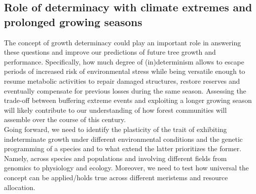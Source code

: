 \documentclass{article}
\begin{document}
\subsection*{Role of determinacy with climate extremes and prolonged growing seasons} %
The concept of growth determinacy could play an important role in answering these questions and improve our predictions of future tree growth and performance. Specifically, how much degree of (in)determinism allows to escape periods of increased risk of environmental stress while being versatile enough to resume metabolic activities to repair damaged structures, restore reserves and eventually compensate for previous losses during the same season. Assessing the trade-off between buffering extreme events and exploiting a longer growing season will likely contribute to our understanding of how forest communities will assemble over the course of this century.\\

Going forward, we need to identify the plasticity of the trait of exhibiting indeterminate growth under different environmental conditions and the genetic programming of a species and to what extend the latter prioritizes the former. Namely, across species and populations and involving different fields from genomics to physiology and ecology. Moreover, we need to test how universal the concept can be applied/holds true across different meristems and resource allocation. %
\end{document}
